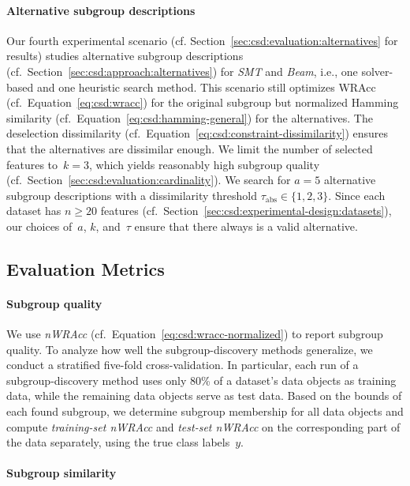 \documentclass{article}
\theoremstyle{definition}
\begin{document}
\paragraph{Alternative subgroup descriptions}

Our fourth experimental scenario (cf. Section~\ref{sec:csd:evaluation:alternatives} for results) studies alternative subgroup descriptions (cf.~Section~\ref{sec:csd:approach:alternatives}) for \emph{SMT} and \emph{Beam}, i.e., one solver-based and one heuristic search method.
This scenario still optimizes WRAcc (cf.~Equation~\ref{eq:csd:wracc}) for the original subgroup but normalized Hamming similarity (cf.~Equation~\ref{eq:csd:hamming-general}) for the alternatives.
The deselection dissimilarity (cf.~Equation~\ref{eq:csd:constraint-dissimilarity}) ensures that the alternatives are dissimilar enough.
We limit the number of selected features to~$k=3$, which yields reasonably high subgroup quality (cf.~Section~\ref{sec:csd:evaluation:cardinality}).
We search for $a=5$ alternative subgroup descriptions with a dissimilarity threshold $\tau_{\text{abs}} \in \{1, 2, 3\}$.
Since each dataset has $n \geq 20$ features (cf.~Section~\ref{sec:csd:experimental-design:datasets}), our choices of~$a$, $k$, and~$\tau$ ensure that there always is a valid alternative.

\subsection{Evaluation Metrics}
\label{sec:csd:experimental-design:metrics}

\paragraph{Subgroup quality}

We use \emph{nWRAcc} (cf.~Equation~\ref{eq:csd:wracc-normalized}) to report subgroup quality.
To analyze how well the subgroup-discovery methods generalize, we conduct a stratified five-fold cross-validation.
In particular, each run of a subgroup-discovery method uses only 80\% of a dataset's data objects as training data, while the remaining data objects serve as test data.
Based on the bounds of each found subgroup, we determine subgroup membership for all data objects and compute \emph{training-set nWRAcc} and \emph{test-set nWRAcc} on the corresponding part of the data separately, using the true class labels~$y$.

\paragraph{Subgroup similarity}
\end{document}
